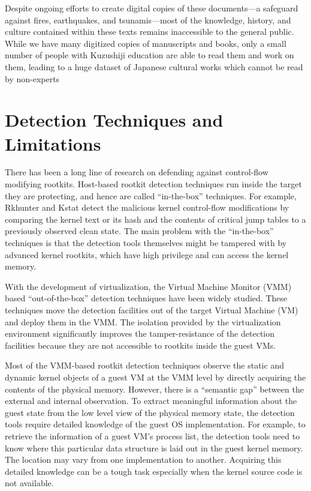 \documentclass[12pt]{report}
\begin{document}
Despite ongoing efforts to create digital copies of these
documents—a safeguard against fires, earthquakes, and tsunamis—most of the knowledge, history,
and culture contained within these texts remains inaccessible to the general public. While we have
many digitized copies of manuscripts and books, only a small number of people with Kuzushiji
education are able to read them and work on them, leading to a huge dataset of Japanese cultural
works which cannot be read by non-experts

\section{Detection Techniques and Limitations}
There has been a long line of research on defending against
control-flow modifying rootkits. Host-based rootkit detection
techniques run inside the target they are protecting, and hence
are called “in-the-box” techniques. For example, Rkhunter and Kstat detect the malicious kernel control-flow
modifications by comparing the kernel text or its hash and the
contents of critical jump tables to a previously observed clean
state. The main problem with the “in-the-box” techniques is
that the detection tools themselves might be tampered with by
advanced kernel rootkits, which have high privilege and can
access the kernel memory.

With the development of virtualization, the Virtual Machine
Monitor (VMM) based “out-of-the-box” detection techniques
have been widely studied. These techniques move the detection
facilities out of the target Virtual Machine (VM) and deploy
them in the VMM. The isolation provided by the virtualization
environment significantly improves the tamper-resistance of the detection facilities because they are not accessible to
rootkits inside the guest VMs.

Most of the VMM-based rootkit detection techniques observe
the static and dynamic kernel objects of a guest VM
at the VMM level by directly acquiring the contents of the
physical memory. However, there is a “semantic gap” between
the external and internal observation. To extract meaningful
information about the guest state from the low level view of
the physical memory state, the detection tools require detailed
knowledge of the guest OS implementation. For example,
to retrieve the information of a guest VM’s process list,
the detection tools need to know where this particular data
structure is laid out in the guest kernel memory. The location
may vary from one implementation to another. Acquiring this
detailed knowledge can be a tough task especially when the
kernel source code is not available.
\end{document}
